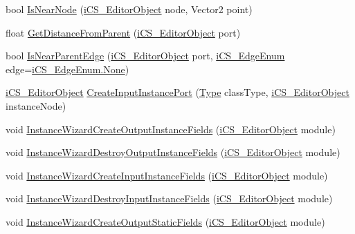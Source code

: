\begin{DoxyCompactItemize}
\item 
bool \hyperlink{classi_c_s___i_storage_a50aa5e0adef50fb7b8661ed01abe797d}{Is\+Near\+Node} (\hyperlink{classi_c_s___editor_object}{i\+C\+S\+\_\+\+Editor\+Object} node, Vector2 point)
\item 
float \hyperlink{classi_c_s___i_storage_afe415267fb2802d8d2a0315b50b306c5}{Get\+Distance\+From\+Parent} (\hyperlink{classi_c_s___editor_object}{i\+C\+S\+\_\+\+Editor\+Object} port)
\item 
bool \hyperlink{classi_c_s___i_storage_a60b3cc9c0ada72cc996edf7ab045fe00}{Is\+Near\+Parent\+Edge} (\hyperlink{classi_c_s___editor_object}{i\+C\+S\+\_\+\+Editor\+Object} port, \hyperlink{i_c_s___edge_enum_8cs_af0c43d9550817659c245d5d49fbb4771}{i\+C\+S\+\_\+\+Edge\+Enum} edge=\hyperlink{i_c_s___edge_enum_8cs_af0c43d9550817659c245d5d49fbb4771a6adf97f83acf6453d4a6a4b1070f3754}{i\+C\+S\+\_\+\+Edge\+Enum.\+None})
\item 
\hyperlink{classi_c_s___editor_object}{i\+C\+S\+\_\+\+Editor\+Object} \hyperlink{classi_c_s___i_storage_afce55c2fa7b30c728029ea6c7ebc1ba9}{Create\+Input\+Instance\+Port} (\hyperlink{i_c_s___object_type_enum_8cs_ae6c3dd6d8597380b56d94908eb431547aa1fa27779242b4902f7ae3bdd5c6d508}{Type} class\+Type, \hyperlink{classi_c_s___editor_object}{i\+C\+S\+\_\+\+Editor\+Object} instance\+Node)
\item 
void \hyperlink{classi_c_s___i_storage_a3dd75259946481cae14a2d93ec995d11}{Instance\+Wizard\+Create\+Output\+Instance\+Fields} (\hyperlink{classi_c_s___editor_object}{i\+C\+S\+\_\+\+Editor\+Object} module)
\item 
void \hyperlink{classi_c_s___i_storage_a4e1506620b83211be1fc3c38a30c2869}{Instance\+Wizard\+Destroy\+Output\+Instance\+Fields} (\hyperlink{classi_c_s___editor_object}{i\+C\+S\+\_\+\+Editor\+Object} module)
\item 
void \hyperlink{classi_c_s___i_storage_ad38a21f11a58dd28af54a1a8446b496a}{Instance\+Wizard\+Create\+Input\+Instance\+Fields} (\hyperlink{classi_c_s___editor_object}{i\+C\+S\+\_\+\+Editor\+Object} module)
\item 
void \hyperlink{classi_c_s___i_storage_a64d9a052ba3d5db429aed22083b6cfc7}{Instance\+Wizard\+Destroy\+Input\+Instance\+Fields} (\hyperlink{classi_c_s___editor_object}{i\+C\+S\+\_\+\+Editor\+Object} module)
\item 
void \hyperlink{classi_c_s___i_storage_a6a2226532c5ea6c6211f6af5e79e74dd}{Instance\+Wizard\+Create\+Output\+Static\+Fields} (\hyperlink{classi_c_s___editor_object}{i\+C\+S\+\_\+\+Editor\+Object} module)

\end{DoxyCompactItemize}
